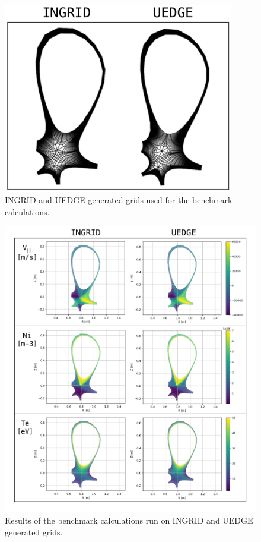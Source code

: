 \begin{figure}[H]
    \centering
        \includegraphics[width=0.9\textwidth]{figures/benchmark/gridue_both.pdf}
        \caption{INGRID and UEDGE generated grids used for the benchmark calculations.}
        \label{fig:ingrid_grid}
\end{figure}
\begin{figure}[H]
    \centering
        \includegraphics[width=\textwidth]{figures/benchmark/BenchmarkCollection.pdf}
        \caption{Results of the benchmark calculations run on INGRID and UEDGE generated grids.}
        \label{fig:benchmark_collection}
\end{figure}

